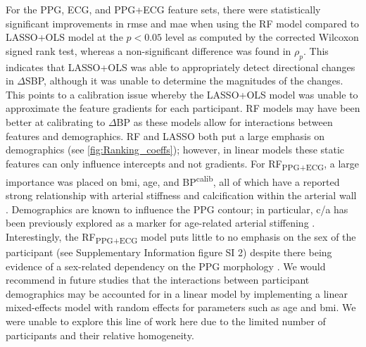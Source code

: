 \documentclass[fleqn,10pt]{wlscirep}
\begin{document}
For the PPG, ECG, and PPG+ECG feature sets, there were statistically significant improvements in \ac{rmse} and \ac{mae} when using the RF model compared to LASSO+OLS model at the $p< 0.05$ level as computed by the corrected Wilcoxon signed rank test, whereas a non-significant difference was found in $\rho_p$. This indicates that LASSO+OLS was able to appropriately detect directional changes in $\Delta$SBP, although it was unable to determine the magnitudes of the changes. This points to a calibration issue whereby the LASSO+OLS model was unable to approximate the feature gradients for each participant. RF models may have been better at calibrating to $\Delta$BP as these models allow for interactions between features and demographics. RF and LASSO both put a large emphasis on demographics (see \cref{fig:Ranking_coeffs}); however, in linear models these static features can only influence intercepts and not gradients. For RF\textsubscript{PPG+ECG}, a large importance was placed on \ac{bmi}, age, and BP\textsuperscript{calib}, all of which have a reported strong relationship with arterial stiffness and calcification within the arterial wall \cite{Ahn2017, Laurent2006}. Demographics are known to influence the PPG contour; in particular, c/a has been previously explored as a marker for age-related arterial stiffening \cite{Elgendi2012}. Interestingly, the RF\textsubscript{PPG+ECG} model puts little to no emphasis on the sex of the participant (see Supplementary Information figure SI 2) despite there being evidence of a sex-related dependency on the PPG morphology \cite{Dehghanojamahalleh2019}. We would recommend in future studies that the interactions between participant demographics may be accounted for in a linear model by implementing a linear mixed-effects model with random effects for parameters such as age and \ac{bmi}. We were unable to explore this line of work here due to the limited number of participants and their relative homogeneity. 
\end{document}
